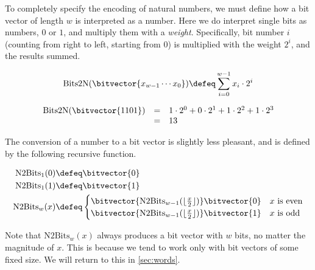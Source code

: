 To completely specify the encoding of natural numbers, we must define
how a bit vector of length $w$ is interpreted as a number. Here we do
interpret single bits as numbers, $0$ or $1$, and multiply them with a
\emph{weight}. Specifically, bit number $i$ (counting from right to
left, starting from 0) is multiplied with the weight $2^{i}$, and the
results summed.

\begin{definition}
\begin{align*}
    \mathrm{Bits2N}(\bitvector{x_{w-1}\cdots x_{0}}) \defeq \sum_{i=0}^{w-1} x_{i} \cdot{} 2^{i}
\end{align*}
\label{def:bits2n}
\end{definition}

\begin{example}
  \[
    \begin{array}{rcl}
      \mathrm{Bits2N}(\bitvector{1101}) & = & 1 \cdot 2^{0} + 0 \cdot 2^{1} + 1 \cdot 2^{2} + 1 \cdot 2^{3} \\
                               & = & 13
    \end{array}
  \]
\end{example}

The conversion of a number to a bit vector is slightly less pleasant,
and is defined by the following recursive function.

\begin{definition}
  \begin{align}
    \mathrm{N2Bits}_{1}(0) \defeq & \bitvector{0} \\
    \mathrm{N2Bits}_{1}(1) \defeq & \bitvector{1} \\
    \mathrm{N2Bits}_{w}(x) \defeq &
                                    \begin{cases}
                                      \bitvector{\mathrm{N2Bits}_{w-1}(\lfloor\frac{x}{2}\rfloor)}\bitvector{0} & \textrm{$x$ is even} \\
                                      \bitvector{\mathrm{N2Bits}_{w-1}(\lfloor\frac{x}{2}\rfloor)}\bitvector{1} & \textrm{$x$ is odd}
                                    \end{cases}
  \end{align}
  \label{def:n2bits}
\end{definition}

Note that $\mathrm{N2Bits}_{w}(x)$ always produces a bit vector with $w$ bits,
no matter the magnitude of $x$.  This is because we tend to work only
with bit vectors of some fixed size. We will return to this in
\cref{sec:words}.

